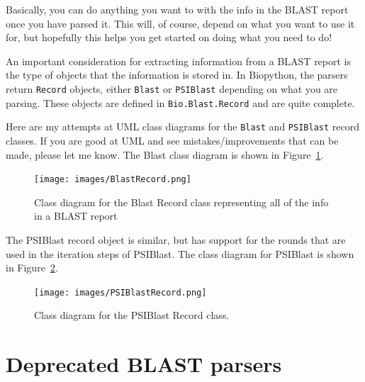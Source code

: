 \documentclass{report}
\begin{document}
Basically, you can do anything you want to with the info in the BLAST
report once you have parsed it. This will, of course, depend on what
you want to use it for, but hopefully this helps you get started on
doing what you need to do!

An important consideration for extracting information from a BLAST report is the type of objects that the information is stored in. In Biopython, the parsers return \verb|Record| objects, either \verb|Blast| or \verb|PSIBlast| depending on what you are parsing. These objects are defined in \verb|Bio.Blast.Record| and are quite complete.

Here are my attempts at UML class diagrams for the \verb|Blast| and \verb|PSIBlast| record classes. If you are good at UML and see mistakes/improvements that can be made, please let me know. The Blast class diagram is shown in Figure~\ref{fig:blastrecord}.

\begin{htmlonly}
\label{fig:blastrecord}
\end{htmlonly}

\begin{latexonly}
\begin{figure}[htbp]
\centering
\texttt{[image: images/BlastRecord.png]}
\caption{Class diagram for the Blast Record class representing all of the info in a BLAST report}
\label{fig:blastrecord}
\end{figure}
\end{latexonly}

The PSIBlast record object is similar, but has support for the rounds that are used in the iteration steps of PSIBlast. The class diagram for PSIBlast is shown in Figure~\ref{fig:psiblastrecord}.

\begin{htmlonly}
\label{fig:psiblastrecord}
\end{htmlonly}

\begin{latexonly}
\begin{figure}[htbp]
\centering
\texttt{[image: images/PSIBlastRecord.png]}
\caption{Class diagram for the PSIBlast Record class.}
\label{fig:psiblastrecord}
\end{figure}
\end{latexonly}

\section{Deprecated BLAST parsers}
\label{sec:parsing-blast-deprecated}
\end{document}
